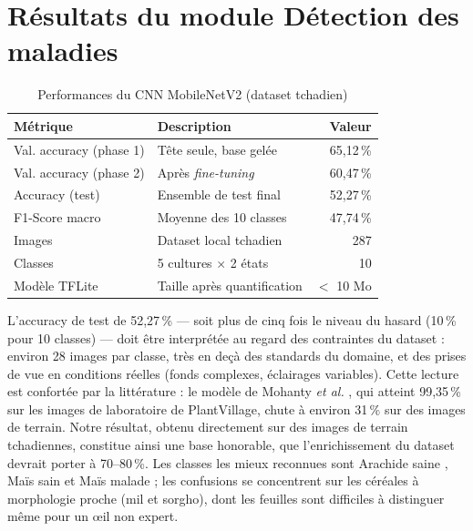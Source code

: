 \section{Résultats du module Détection des maladies}
\label{sec:res_maladies}

\begin{table}[H]
	\centering
	\caption{Performances du CNN MobileNetV2 (dataset tchadien)}
	\label{tab:res_cnn}
	\begin{tabularx}{\textwidth}{lXr}
		\toprule
		\textbf{Métrique} & \textbf{Description} & \textbf{Valeur} \\
		\midrule
		Val. accuracy (phase 1) & Tête seule, base gelée      & 65,12\,\% \\
		Val. accuracy (phase 2) & Après \textit{fine-tuning}  & 60,47\,\% \\
		Accuracy (test)         & Ensemble de test final      & 52,27\,\% \\
		F1-Score macro          & Moyenne des 10 classes      & 47,74\,\% \\
		\midrule
		Images                  & Dataset local tchadien      & 287 \\
		Classes                 & 5 cultures $\times$ 2 états & 10 \\
		Modèle TFLite           & Taille après quantification & $<$ 10 Mo \\
		\bottomrule
	\end{tabularx}
\end{table}

L'accuracy de test de 52,27\,\% --- soit plus de cinq fois le
niveau du hasard (10\,\% pour 10 classes) --- doit être
interprétée au regard des contraintes du dataset :
environ 28 images par classe, très en deçà des standards du
domaine, et des prises de vue en conditions réelles (fonds
complexes, éclairages variables). Cette lecture est confortée
par la littérature : le modèle de Mohanty \textit{et al.}
\cite{mohanty2016deep}, qui atteint 99,35\,\% sur les images de
laboratoire de PlantVillage, chute à environ 31\,\% sur des
images de terrain. Notre résultat, obtenu directement sur des
images de terrain tchadiennes, constitue ainsi une base
honorable, que l'enrichissement du dataset devrait porter à
70--80\,\%. Les classes les mieux reconnues sont
\og Arachide saine \fg{}, \og Maïs sain \fg{} et
\og Maïs malade \fg{} ; les confusions se concentrent sur les
céréales à morphologie proche (mil et sorgho), dont les feuilles
sont difficiles à distinguer même pour un \oe il non expert.

